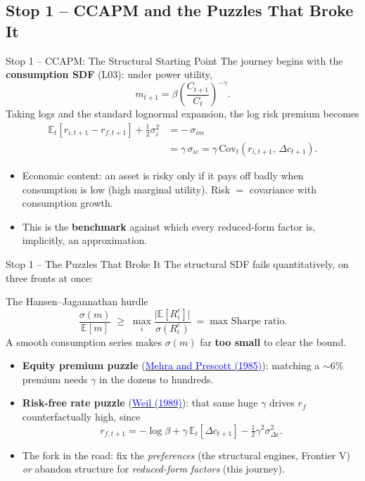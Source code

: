 \documentclass{beamer}
\newcommand{\E}{\mathbb{E}}
\newcommand{\Cov}{\mathrm{Cov}}
\begin{document}
\subsection{Stop 1 -- CCAPM and the Puzzles That Broke It}

\begin{frame}{Stop 1 -- CCAPM: The Structural Starting Point}
The journey begins with the \textbf{consumption SDF} (L03): under power utility,
\[
m_{t+1}=\beta\left(\frac{C_{t+1}}{C_t}\right)^{-\gamma}.
\]
Taking logs and the standard lognormal expansion, the log risk premium becomes
\begin{align*}
\E_t\!\left[r_{i,t+1}-r_{f,t+1}\right]+\tfrac{1}{2}\sigma_i^2
   &= -\,\sigma_{im} \\[2pt]
   &= \gamma\,\sigma_{ic}
   = \gamma\,\Cov_t(r_{i,t+1},\,\Delta c_{t+1}).
\end{align*}
\begin{itemize}
  \item \alert{Economic content:} an asset is risky only if it pays off badly when consumption is low (high marginal utility). Risk $=$ covariance with consumption growth.
  \item This is the \textbf{benchmark} against which every reduced-form factor is, implicitly, an approximation.
\end{itemize}
\end{frame}

\begin{frame}{Stop 1 -- The Puzzles That Broke It}
The structural SDF fails \alert{quantitatively}, on three fronts at once:
\begin{block}{The Hansen--Jagannathan hurdle}
\[
\frac{\sigma(m)}{\E[m]} \;\geq\; \max_i \frac{\big|\E[R^e_i]\big|}{\sigma(R^e_i)} \;=\; \text{max Sharpe ratio.}
\]
A smooth consumption series makes $\sigma(m)$ far \textbf{too small} to clear the bound.
\end{block}
\begin{itemize}
  \item \textbf{Equity premium puzzle} (\href{https://doi.org/10.1016/0304-3932(85)90061-3}{\textcolor{blue}{Mehra and Prescott (1985)}}): matching a $\sim 6\%$ premium needs $\gamma$ in the \alert{dozens to hundreds}.
  \item \textbf{Risk-free rate puzzle} (\href{https://doi.org/10.1016/0304-3932(89)90028-7}{\textcolor{blue}{Weil (1989)}}): that same huge $\gamma$ drives $r_f$ counterfactually high, since
  \[
  r_{f,t+1}=-\log\beta+\gamma\,\E_t[\Delta c_{t+1}]-\tfrac{1}{2}\gamma^2\sigma_{\Delta c}^2 .
  \]
  \item \alert{The fork in the road:} fix the \textit{preferences} (the structural engines, Frontier V) \emph{or} abandon structure for \textit{reduced-form factors} (this journey).
\end{itemize}
\end{frame}
\end{document}
